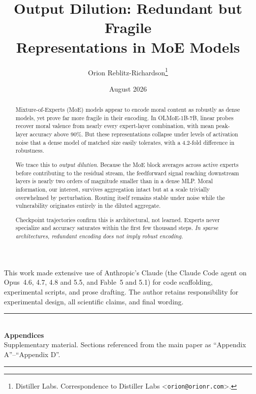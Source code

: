 \documentclass{article}
\title{Output Dilution: Redundant but Fragile\\
  Representations in MoE Models}
\author{%
  Orion Reblitz-Richardson\thanks{%
    Distiller Labs. Correspondence to Distiller Labs
    \textless\texttt{orion@orionr.com}\textgreater.}
}
\date{August 2026}
\begin{document}
\maketitle

\begin{abstract}
Mixture-of-Experts (MoE) models appear to encode moral content as
robustly as dense models, yet prove far more fragile in their encoding.
In OLMoE-1B-7B, linear probes recover moral valence from nearly every
expert-layer combination, with mean peak-layer accuracy above 90\%. But
these representations collapse under levels of activation noise that a
dense model of matched size easily tolerates, with a 4.2-fold
difference in robustness.

We trace this to \emph{output dilution}. Because the MoE block averages
across active experts before contributing to the residual stream, the
feedforward signal reaching downstream layers is nearly two orders of
magnitude smaller than in a dense MLP. Moral information, our interest,
survives aggregation intact but at a scale trivially overwhelmed by
perturbation. Routing itself remains stable under noise while the
vulnerability originates entirely in the diluted aggregate.

Checkpoint trajectories confirm this is architectural, not learned.
Experts never specialize and accuracy saturates within the first few
thousand steps. \emph{In sparse architectures, redundant encoding does
not imply robust encoding.}
\end{abstract}








\begin{ack}
This work made extensive use of Anthropic's Claude (the Claude Code agent on
Opus~4.6, 4.7, 4.8 and 5.5, and Fable~5 and 5.1) for code scaffolding, experimental scripts, and
prose drafting. The author retains responsibility for experimental design, all
scientific claims, and final wording.
\end{ack}



\appendix
\newpage
\begin{center}
  \rule{0.5\linewidth}{0.4pt}\\[0.6em]
  {\Large\bfseries Appendices}\\[0.25em]
  {\small Supplementary material. Sections referenced from the main
   paper as ``Appendix A''--``Appendix D''.}\\[0.4em]
  \rule{0.5\linewidth}{0.4pt}
\end{center}
\vspace{0.5em}





\end{document}
